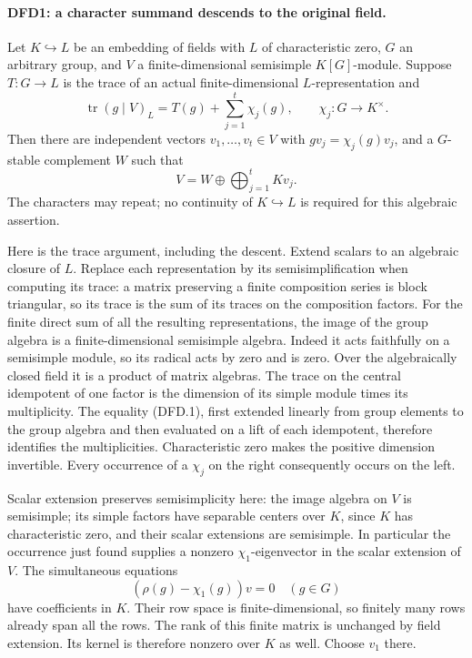 \paragraph{DFD1: a character summand descends to the original field.}
\label{claim:DFD1}
Let $K\hookrightarrow L$ be an embedding of fields with $L$ of
characteristic zero, $G$ an arbitrary group, and $V$ a finite-dimensional
semisimple $K[G]$-module. Suppose $T:G\to L$ is the trace of an actual
finite-dimensional $L$-representation and
\[
 \operatorname{tr}(g\mid V)_L=T(g)+\sum_{j=1}^{t}\chi_j(g),
 \qquad \chi_j:G\longrightarrow K^\times.                 \tag{DFD.1}
\]
Then there are independent vectors $v_1,\ldots,v_t\in V$ with
$gv_j=\chi_j(g)v_j$, and a $G$-stable complement $W$ such that
\[
 V=W\oplus\bigoplus_{j=1}^{t}Kv_j.                       \tag{DFD.2}
\]
The characters may repeat; no continuity of $K\hookrightarrow L$ is
required for this algebraic assertion.

Here is the trace argument, including the descent. Extend scalars to
an algebraic closure of $L$. Replace each representation by its
semisimplification when computing its trace: a matrix preserving a
finite composition series is block triangular, so its trace is the
sum of its traces on the composition factors. For the finite direct
sum of all the resulting representations, the image of the group
algebra is a finite-dimensional semisimple algebra. Indeed it acts
faithfully on a semisimple module, so its radical acts by zero and
is zero. Over the algebraically closed field it is a product of
matrix algebras. The trace on the central idempotent of one factor
is the dimension of its simple module times its multiplicity.
The equality (DFD.1), first extended linearly from group elements to
the group algebra and then evaluated on a lift of each idempotent,
therefore identifies the multiplicities. Characteristic zero makes
the positive dimension invertible. Every occurrence of a $\chi_j$
on the right consequently occurs on the left.

Scalar extension preserves semisimplicity here: the image algebra
on $V$ is semisimple; its simple factors have separable centers over
$K$, since $K$ has characteristic zero, and their scalar extensions
are semisimple. In particular the occurrence just found supplies
a nonzero $\chi_1$-eigenvector in the scalar extension of $V$.
The simultaneous equations
\[
 (\rho(g)-\chi_1(g))v=0\quad(g\in G)
\]
have coefficients in $K$. Their row space is finite-dimensional,
so finitely many rows already span all the rows. The rank of this
finite matrix is unchanged by field extension. Its kernel is
therefore nonzero over $K$ as well. Choose $v_1$ there.


